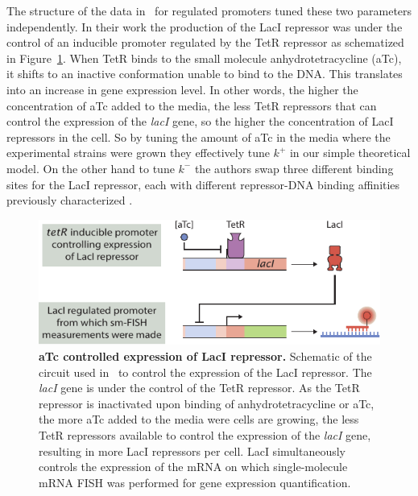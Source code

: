 The structure of the data in~\cite{Jones2014} for regulated promoters tuned
these two parameters independently. In their work the production of the LacI
repressor was under the control of an inducible promoter regulated by the TetR
repressor as schematized in Figure~\ref{figS:aTc_circuit}. When TetR binds to the
small molecule anhydrotetracycline (aTc), it shifts to an inactive conformation
unable to bind to the DNA. This translates into an increase in gene expression
level. In other words, the higher the concentration of aTc added to the media,
the less TetR repressors that can control the expression of the \textit{lacI}
gene, so the higher the concentration of LacI repressors in the cell. So by 
tuning the amount of aTc in the media where the experimental strains were grown
they effectively tune $k^+$ in our simple theoretical model. On the other hand
to tune $k^-$ the authors swap three different binding sites for the LacI 
repressor, each with different repressor-DNA binding affinities previously 
characterized \cite{Garcia2011a}.

\begin{figure}[h!]
\centering
\includegraphics{../../figures/si/figS0X_aTc_circuit.pdf}
\caption{\textbf{aTc controlled expression of LacI repressor.} Schematic of the
circuit used in~\cite{Jones2014} to control the expression of the LacI
repressor. The \textit{lacI} gene is under the control of the TetR repressor. As
the TetR repressor is inactivated upon binding of anhydrotetracycline or aTc,
the more aTc added to the media were cells are growing, the less TetR repressors
available to control the expression of the \textit{lacI} gene, resulting in more
LacI repressors per cell. LacI simultaneously controls the expression of the
mRNA on which single-molecule mRNA FISH was performed for gene expression
quantification.}
\label{figS:aTc_circuit}
\end{figure}

